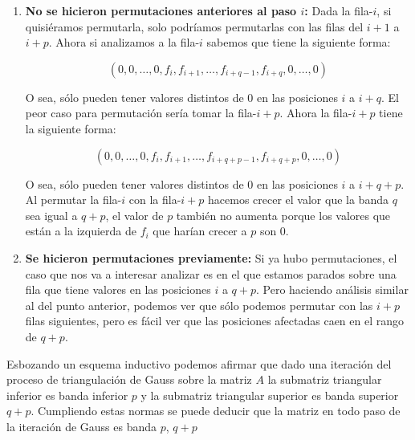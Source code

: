 \begin{enumerate}
    \item {\bf No se hicieron permutaciones anteriores al paso $i$:} Dada la fila-$i$, si quisiéramos permutarla, solo podríamos permutarlas con las filas del $i + 1$ a $i + p$. Ahora si analizamos a la fila-$i$ sabemos que tiene la siguiente forma:

    \begin{displaymath}
        (0, 0, \dots, 0, f_i, f_{i + 1}, \dots, f_{i + q - 1}, f_{i + q}, 0, \dots, 0)
    \end{displaymath}

    O sea, sólo pueden tener valores distintos de $0$ en las posiciones $i$ a $i + q$. El peor caso para permutación sería tomar la fila-${i + p}$. Ahora la fila-${i + p}$ tiene la siguiente forma:

    \begin{displaymath}
        (0, 0, \dots, 0, f_i, f_{i + 1}, \dots, f_{i + q + p - 1}, f_{i + q + p}, 0, \dots, 0)
    \end{displaymath}

    O sea, sólo pueden tener valores distintos de $0$ en las posiciones $i$ a $i + q + p$. Al permutar la fila-$i$ con la fila-${i + p}$ hacemos crecer el valor que la banda $q$ sea igual a $q + p$, el valor de $p$ también no aumenta porque los valores que están a la izquierda de $f_i$ que harían crecer a $p$ son 0.

    \item {\bf Se hicieron permutaciones previamente:} Si ya hubo permutaciones, el caso que nos va a interesar analizar es en el que estamos parados sobre una fila que tiene valores en las posiciones $i$ a $q + p$. Pero haciendo análisis similar al del punto anterior, podemos ver que sólo podemos permutar con las $i + p$ filas siguientes, pero es fácil ver que las posiciones afectadas caen en el rango de $q + p$.
\end{enumerate}

Esbozando un esquema inductivo podemos afirmar que dado una iteración del proceso de triangulación de Gauss sobre la matriz $A$ la submatriz triangular inferior es banda inferior $p$ y la submatriz triangular superior es banda superior $q + p$. Cumpliendo estas normas se puede deducir que la matriz en todo paso de la iteración de Gauss es banda $p$, $q + p$
